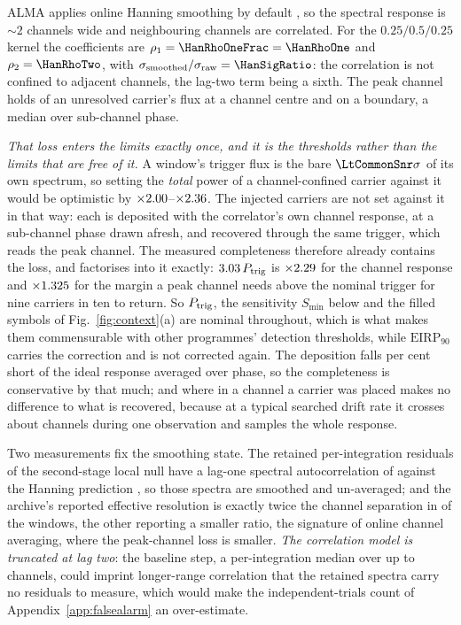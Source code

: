ALMA applies online Hanning smoothing by default \citep{ALMAHandbook}, so
the spectral response is ${\sim}2$ channels wide and neighbouring channels
are correlated. For the $0.25/0.5/0.25$ kernel the coefficients
are $\rho_1=\HanRhoOneFrac=\HanRhoOne$ and $\rho_2=\HanRhoTwo$, with
$\sigma_{\rm smoothed}/\sigma_{\rm raw}=\HanSigRatio$: the correlation is
not confined to adjacent channels, the lag-two term being a sixth. The peak
channel holds \HanBest{} of an unresolved carrier's flux at a channel centre
and \HanWorst{} on a boundary, a median \HanMed{} over sub-channel phase.

\emph{That loss enters the limits exactly once, and it is the thresholds
rather than the limits that are free of it.} A window's trigger flux is the
bare $\LtCommonSnr\sigma$ of its own spectrum, so setting the \emph{total}
power of a channel-confined carrier against it would be optimistic by
$\times2.00$--$\times2.36$. The injected carriers are not set
against it in that way: each is deposited with the correlator's own channel
response, at a sub-channel phase drawn afresh, and recovered through the same
trigger, which reads the peak channel. The measured completeness therefore
already contains the loss, and factorises into it exactly:
$3.03\,P_{\rm trig}$ is $\times2.29$ for the channel
response and $\times1.325$ for the margin a peak channel needs
above the nominal trigger for nine carriers in ten to return. So
$P_{\rm trig}$, the sensitivity $S_{\min}$ below and the filled symbols of
Fig.~\ref{fig:context}(a) are nominal throughout, which is what makes them
commensurable with other programmes' detection thresholds, while
$\mathrm{EIRP}_{90}$ carries the correction and is not corrected again.
The deposition falls \InjShortPct{} per cent short of the ideal response
averaged over phase, so the completeness is conservative by that much; and
where in a channel a carrier was placed makes no difference to what is
recovered, because at a typical searched drift rate it crosses about
\InjDriftChan{} channels during one observation and samples the whole
response.

Two measurements fix the smoothing state. The retained per-integration
residuals of the second-stage local null have a lag-one spectral
autocorrelation of \LNLagOne{} against the Hanning prediction \HanRhoOne, so
those spectra are smoothed and un-averaged; and the archive's reported
effective resolution is exactly twice the channel separation in \NHanTwo{} of
the \NHanKnown{} windows, the other \NHanOther{} reporting a smaller ratio,
the signature of online channel averaging, where the peak-channel loss is
smaller. \emph{The correlation model is truncated at lag two}: the
baseline step, a per-integration median over up to \MedWin{} channels, could
imprint longer-range correlation that the retained spectra carry no residuals
to measure, which would make the independent-trials count of
Appendix~\ref{app:falsealarm} an over-estimate.

